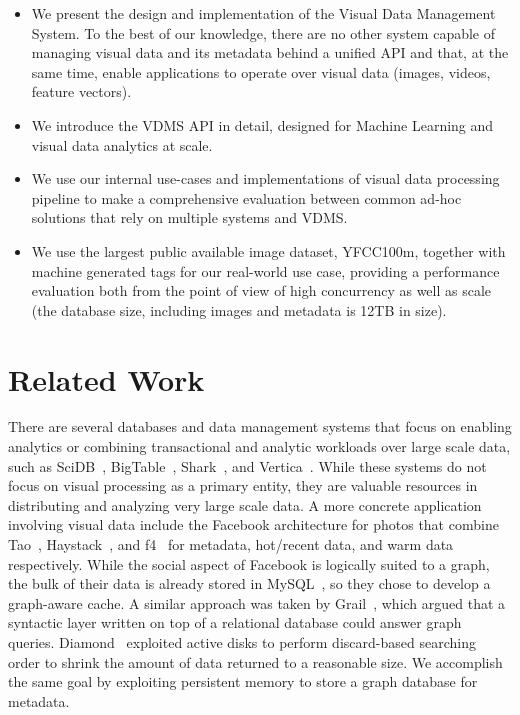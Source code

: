 \begin{itemize}
\item We present the design and implementation of the Visual Data Management System.
To the best of our knowledge, there are no other system capable of
managing visual data and its metadata behind a unified API
and that, at the same time, enable applications to operate over visual data
(images, videos, feature vectors).

\item We introduce the VDMS API in detail, designed for Machine Learning and visual
data analytics at scale.

\item We use our internal use-cases and implementations of visual data processing
pipeline to make a comprehensive evaluation between common ad-hoc solutions
that rely on multiple systems and VDMS.

\item We use the largest public available image dataset, YFCC100m, together
with machine generated tags for our real-world use case, providing a performance
evaluation both from the point of view of high concurrency as well as
scale (the database size, including images and metadata is 12TB in size).
\end{itemize}

\section{Related Work}

There are several databases and data management systems that focus on enabling
analytics or combining transactional and analytic workloads over large
scale data, such as SciDB~\cite{brown2010overview},
BigTable~\cite{chang2008bigtable}, Shark~\cite{xin2013shark},
and Vertica~\cite{lamb2012vertica}.
While these systems do not focus on visual processing as a primary entity,
they are valuable resources in distributing and analyzing very large scale data.
A more concrete application involving visual data include
the Facebook architecture for photos that combine Tao~\cite{tao},
Haystack~\cite{beaver2010finding}, and f4~\cite{muralidhar2014f4} for metadata,
hot/recent data, and warm data respectively.
While the social aspect of Facebook is logically suited to a graph,
the bulk of their data is already stored in MySQL~\cite{mysql},
so they chose to develop a graph-aware cache.
A similar approach was taken by Grail~\cite{fan2015case},
which argued that a syntactic layer written on top of a relational database
could answer graph queries.
Diamond~\cite{huston2004diamond,satyanarayanan2010unique} exploited active
disks to perform discard-based searching order to shrink the amount of data
returned to a reasonable size.
We accomplish the same goal by exploiting persistent memory to store a
graph database for metadata.
